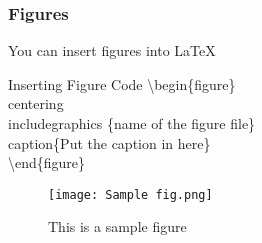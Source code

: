 \documentclass{beamer}
\begin{document}

\begin{frame}
\frametitle{Figures}

You can insert figures into LaTeX

\begin{block}{Inserting Figure Code}
\textbackslash begin\{figure\}
\\
\hspace{1cm}\texbackslash centering
\\
\hspace{1cm}\texbackslash includegraphics \{name of the figure file\}
\\
\hspace{1cm}\texbackslash caption\{Put the caption in here\}
\\
\textbackslash end\{figure\}
\end{block}

\begin{example} [Figure]
\begin{figure}
\centering
\texttt{[image: Sample fig.png]}
\caption{This is a sample figure}
\end{figure}
\end{example}

\end{frame}

\end{document}
